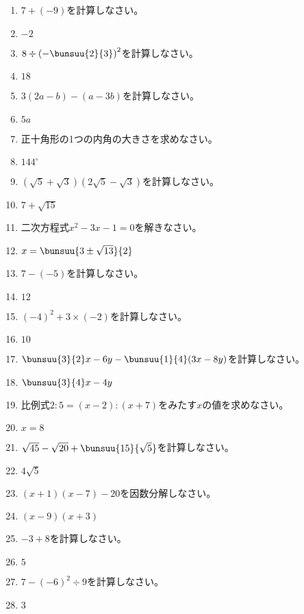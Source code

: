 \documentclass[uplatex,a4j,11pt]{jsreport}
\begin{document}
\begin{multicols}{2}
\begin{enumerate}
    \item $7+(-9)$\quad を計算しなさい。%
    \item $-2$
    \item $8\div \left(-\bunsuu{2}{3}\right)^2$\quad を計算しなさい。%
    \item $18$
    \item $3(2a-b)-(a-3b)$\quad を計算しなさい。%
    \item $5a$
    \item 正十角形の1つの内角の大きさを求めなさい。%
    \item $144^\circ$
    \item $(\sqrt{5}+\sqrt{3})(2\sqrt{5}-\sqrt{3})$\quad を計算しなさい。%
    \item $7+\sqrt{15}$
    \item 二次方程式\quad$x^2-3x-1=0$\quad を解きなさい。%
    \item $x=\bunsuu{3\pm\sqrt{13}}{2}$
    \item $7-(-5)$\quad を計算しなさい。%
    \item $12$
    \item $(-4)^2+3\times (-2)$\quad を計算しなさい。%
    \item $10$
    \item $\bunsuu{3}{2}x-6y-\bunsuu{1}{4}(3x-8y)$\quad を計算しなさい。%
    \item $\bunsuu{3}{4}x-4y$
    \item 比例式\quad$2:5=(x-2):(x+7)$\quad をみたす\quad$x$\quad の値を求めなさい。%
    \item $x=8$
    \item $\sqrt{45}-\sqrt{20}+\bunsuu{15}{\sqrt{5}}$\quad を計算しなさい。%
    \item $4\sqrt{5}$
    \item $(x+1)(x-7)-20$\quad を因数分解しなさい。%
    \item $(x-9)(x+3)$
    \item $-3+8$\quad を計算しなさい。%
    \item $5$
    \item $7-(-6)^2\div 9$\quad を計算しなさい。%
    \item $3$

\end{enumerate}
\end{multicols}
\end{document}
